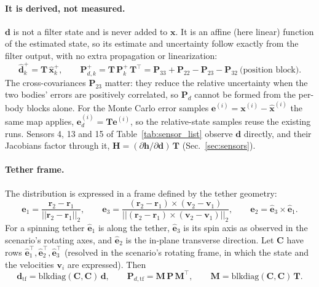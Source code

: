 \documentclass[]{article}
\newcommand{\norm}[1]{\left| \left| #1 \right| \right|_{2}}
\newcommand{\x}{\bm{x}}
\newcommand{\xh}{\hat{\bm{x}}}
\newcommand{\Pm}{\mathbf{P}}
\newcommand{\Hm}{\mathbf{H}}
\begin{document}
\paragraph{It is derived, not measured.}
$\bm{d}$ is not a filter state and is never added to $\x$. It is an affine
(here linear) function of the estimated state, so its estimate and uncertainty
follow exactly from the filter output, with no extra propagation or
linearization:
\begin{equation}
  \hat{\bm{d}}_k^+ = \mathbf{T}\,\xh_k^+, \qquad
  \Pm_{d,k}^+ = \mathbf{T}\,\Pm_k^+\,\mathbf{T}^\top
  = \Pm_{33} + \Pm_{22} - \Pm_{23} - \Pm_{32}\ \text{(position block)}.
  \label{eq:relative-cov}
\end{equation}
The cross-covariances $\Pm_{23}$ matter: they reduce the relative uncertainty
when the two bodies' errors are positively correlated, so $\Pm_{d}$ cannot be
formed from the per-body blocks alone. For the Monte Carlo error samples
$\bm{e}^{(i)} = \x^{(i)} - \xh^{(i)}$ the same map applies,
$\bm{e}_d^{(i)} = \mathbf{T}\bm{e}^{(i)}$, so the relative-state samples
reuse the existing runs. Sensors 4, 13 and 15 of
Table~\ref{tab:sensor_list} observe $\bm{d}$ directly, and their Jacobians
factor through it, $\Hm = (\partial\bm{h}/\partial\bm{d})\,\mathbf{T}$
(Sec.~\ref{sec:sensors}).

\paragraph{Tether frame.}
The distribution is expressed in a frame defined by the tether geometry:
\begin{equation}
  \hat{\mathbf{e}}_1 = \frac{\mathbf{r}_2-\mathbf{r}_1}{\norm{\mathbf{r}_2-\mathbf{r}_1}},
  \qquad
  \hat{\mathbf{e}}_3 = \frac{(\mathbf{r}_2-\mathbf{r}_1)\times(\mathbf{v}_2-\mathbf{v}_1)}
                         {\norm{(\mathbf{r}_2-\mathbf{r}_1)\times(\mathbf{v}_2-\mathbf{v}_1)}},
  \qquad
  \hat{\mathbf{e}}_2 = \hat{\mathbf{e}}_3\times\hat{\mathbf{e}}_1.
  \label{eq:tether-frame}
\end{equation}
For a spinning tether $\hat{\mathbf{e}}_1$ is along the tether, $\hat{\mathbf{e}}_3$
is its spin axis as observed in the scenario's rotating axes, and
$\hat{\mathbf{e}}_2$ is the in-plane transverse direction.
Let $\mathbf{C}$ have rows $\hat{\mathbf{e}}_1^\top,\hat{\mathbf{e}}_2^\top,
\hat{\mathbf{e}}_3^\top$ (resolved in the scenario's rotating frame, in which
the state and the velocities $\mathbf{v}_i$ are expressed). Then
\begin{equation}
  \bm{d}_{\mathrm{tf}} = \mathrm{blkdiag}(\mathbf{C},\mathbf{C})\,\bm{d}, \qquad
  \Pm_{d,\mathrm{tf}} = \mathbf{M}\,\Pm\,\mathbf{M}^\top, \qquad
  \mathbf{M} = \mathrm{blkdiag}(\mathbf{C},\mathbf{C})\,\mathbf{T}.
\end{equation}
\end{document}
